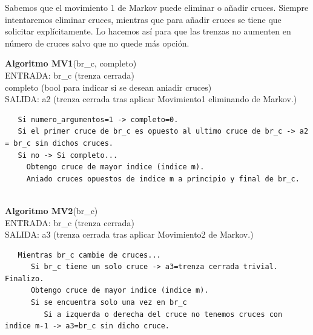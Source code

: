 Sabemos que el movimiento 1 de Markov puede eliminar o añadir cruces. Siempre intentaremos eliminar cruces, mientras que para añadir cruces se tiene que solicitar explícitamente. Lo hacemos así para que las trenzas no aumenten en número de cruces salvo que no quede más opción. \\ 

\begin{alg}
	\textbf{Algoritmo MV1}(br\_c, completo)\\
	ENTRADA: br\_c (trenza cerrada)\\
	\hspace*{2.2cm} completo (bool para indicar si se desean aniadir cruces)\\
	SALIDA: \hspace{0.4cm} a2 (trenza cerrada tras aplicar Movimiento1 eliminando de Markov.) 
	
\begin{lstlisting}
   Si numero_argumentos=1 -> completo=0.
   Si el primer cruce de br_c es opuesto al ultimo cruce de br_c -> a2 = br_c sin dichos cruces.
   Si no -> Si completo... 
     Obtengo cruce de mayor indice (indice m).
     Aniado cruces opuestos de indice m a principio y final de br_c.
      
\end{lstlisting}
\end{alg}

\begin{alg}
	\textbf{Algoritmo MV2}(br\_c)\\
	ENTRADA: br\_c (trenza cerrada)\\
	SALIDA: \hspace{0.4cm} a3 (trenza cerrada tras aplicar Movimiento2 de Markov.) 
	
\begin{lstlisting}
   Mientras br_c cambie de cruces...
      Si br_c tiene un solo cruce -> a3=trenza cerrada trivial. Finalizo.
      Obtengo cruce de mayor indice (indice m). 
      Si se encuentra solo una vez en br_c
         Si a izquerda o derecha del cruce no tenemos cruces con indice m-1 -> a3=br_c sin dicho cruce.
         
\end{lstlisting}
\end{alg}

